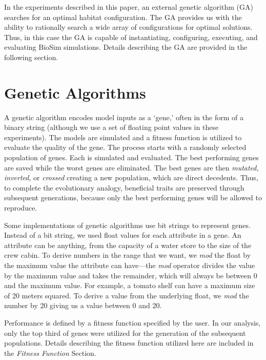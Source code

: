 \documentclass[submit]{aiaa}
\begin{document}
In the experiments described in this paper, an external genetic algorithm (GA) searches for an optimal habitat configuration.  
The GA provides us with the ability to rationally search a wide array of configurations for optimal solutions.
Thus, in this case the GA is capable of instantiating, configuring, executing, and evaluating BioSim simulations.
Details describing the GA are provided in the following section.

\section{Genetic Algorithms}

A genetic algorithm \cite{holland75} encodes model inputs as a `gene,'
often in the form of a binary string (although we use a set of
floating point values in these experiments).  The models are simulated
and a fitness function is utilized to evaluate the quality of the
gene.  The process starts with a randomly selected population of
genes.  Each is simulated and evaluated.  The best performing genes
are saved while the worst genes are eliminated.  The best genes are
then \emph{mutated}, \emph{inverted}, or \emph{crossed} creating a new
population, which are direct decedents. Thus, to complete the
evolutionary analogy, beneficial traits are preserved through subsequent
generations, because only the best performing genes will be allowed to
reproduce.

Some implementations of genetic algorithms use bit strings to represent genes.
Instead of a bit string, we used float values for each attribute in a gene.  
An attribute can be anything, from the capacity of a water store to the size of the crew cabin.
To derive numbers in the range that we want, we {\em mod} the float by the maximum value the attribute can have---the {\em mod} operator divides the value by the maximum value and takes the remainder, which will always be between 0 and the maximum value.  
For example, a tomato shelf can have a maximum size of 20 meters squared.  
To derive a value from the underlying float, we {\em mod} the number by 20 giving us a value between 0 and 20.  

Performance is defined by a fitness function specified by the user. In
our analysis, only the top third of genes were utilized for the
generation of the subsequent populations. Details describing the
fitness function utilized here are included in the \emph{Fitness Function} Section.%
\end{document}
